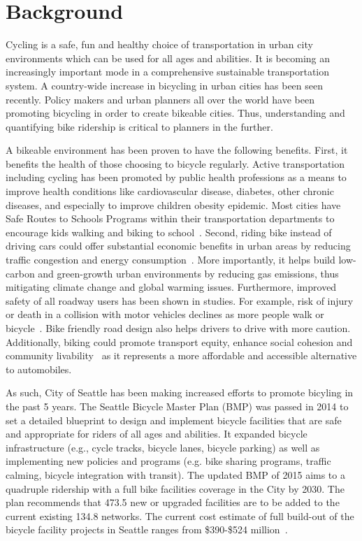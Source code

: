 \documentclass [11pt, proquest] {uwthesis}[2015/03/03]
\begin{document}
\section{Background}
Cycling is a safe, fun and healthy choice of transportation in urban city environments which can be used for all ages and abilities. It is becoming an increasingly important mode in a comprehensive sustainable transportation system.  A country-wide increase in bicycling in urban cities has been seen recently. %
Policy makers and urban planners all over the world have been promoting bicycling in order to create bikeable cities. Thus, understanding and quantifying bike ridership is critical to planners in the further.

A bikeable environment has been proven to have the following benefits. First, it benefits the health of those choosing to bicycle regularly. Active transportation including cycling has been promoted by public health professions as a means to improve health conditions like cardiovascular disease, diabetes, other chronic diseases, and especially to improve children obesity epidemic. Most cities have Safe Routes to Schools Programs within their transportation departments to encourage kids walking and biking to school~\cite{Skerett01,Colditz97}. Second, riding bike instead of driving cars could offer substantial economic benefits in urban areas by reducing traffic congestion and energy consumption~\cite{Sener09}. More importantly, it helps build low-carbon and green-growth urban environments by reducing gas emissions, thus mitigating climate change and global warming issues. Furthermore, improved safety of all roadway users has been shown in studies. For example, risk of injury or death in a collision with motor vehicles declines as more people walk or bicycle~\cite{Turner06,Wittink03}. Bike friendly road design also helps drivers to drive with more caution. Additionally, biking could promote transport equity, enhance social cohesion and community livability~\cite{Litman07} as it represents a more affordable and accessible alternative to automobiles.

As such, City of Seattle has been making increased efforts to promote bicyling in the past 5 years. The Seattle Bicycle Master Plan (BMP) was passed in 2014 to set a detailed blueprint to design and implement bicycle facilities that are safe and appropriate for riders of all ages and abilities. It expanded bicycle infrastructure (e.g., cycle tracks, bicycle lanes, bicycle parking) as well as implementing new policies and programs (e.g. bike sharing programs, traffic calming, bicycle integration with transit). The updated BMP of 2015 aims to a quadruple ridership with a full bike facilities coverage in the City by 2030. The plan recommends that 473.5 new or upgraded facilities are to be added to the current existing 134.8 networks. The current cost estimate of full build-out of the bicycle facility projects in Seattle ranges from \$390-\$524 million~\cite{SDOT_BMP15}.
\end{document}
